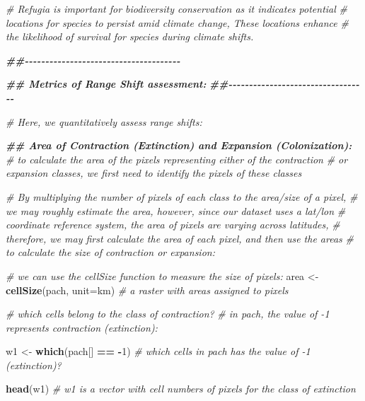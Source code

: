 \documentclass[
]{article}
\newenvironment{Shaded}{\begin{snugshade}}{\end{snugshade}}
\newcommand{\AttributeTok}[1]{\textcolor[rgb]{0.13,0.29,0.53}{#1}}
\newcommand{\CommentTok}[1]{\textcolor[rgb]{0.56,0.35,0.01}{\textit{#1}}}
\newcommand{\DecValTok}[1]{\textcolor[rgb]{0.00,0.00,0.81}{#1}}
\newcommand{\DocumentationTok}[1]{\textcolor[rgb]{0.56,0.35,0.01}{\textbf{\textit{#1}}}}
\newcommand{\FunctionTok}[1]{\textcolor[rgb]{0.13,0.29,0.53}{\textbf{#1}}}
\newcommand{\NormalTok}[1]{#1}
\newcommand{\OtherTok}[1]{\textcolor[rgb]{0.56,0.35,0.01}{#1}}
\newcommand{\SpecialCharTok}[1]{\textcolor[rgb]{0.81,0.36,0.00}{\textbf{#1}}}
\newcommand{\StringTok}[1]{\textcolor[rgb]{0.31,0.60,0.02}{#1}}
\begin{document}
\begin{Shaded}
\begin{Highlighting}[]
\CommentTok{\# Refugia is important for biodiversity conservation as it indicates potential }
\CommentTok{\# locations for species to persist amid climate change, These locations enhance }
\CommentTok{\# the likelihood of survival for species during climate shifts.}

\DocumentationTok{\#\#{-}{-}{-}{-}{-}{-}{-}{-}{-}{-}{-}{-}{-}{-}{-}{-}{-}{-}{-}{-}{-}{-}{-}{-}{-}{-}{-}{-}{-}{-}{-}{-}{-}{-}{-}{-}{-}{-}}

\DocumentationTok{\#\# Metrics of Range Shift assessment:}
\DocumentationTok{\#\#{-}{-}{-}{-}{-}{-}{-}{-}{-}{-}{-}{-}{-}{-}{-}{-}{-}{-}{-}{-}{-}{-}{-}{-}{-}{-}{-}{-}{-}{-}{-}{-}{-}{-}}

\CommentTok{\# Here, we quantitatively assess range shifts:}

\DocumentationTok{\#\# Area of Contraction (Extinction) and Expansion (Colonization):}
\CommentTok{\# to calculate the area of the pixels representing either of the contraction}
\CommentTok{\# or expansion classes, we first need to identify the pixels of these classes}

\CommentTok{\# By multiplying the number of pixels of each class to the area/size of a pixel,}
\CommentTok{\# we may roughly estimate the area, however, since our dataset uses a lat/lon}
\CommentTok{\# coordinate reference system, the area of pixels are varying across latitudes,}
\CommentTok{\# therefore, we may first calculate the area of each pixel, and then use the areas}
\CommentTok{\# to calculate the size of contraction or expansion:}

\CommentTok{\# we can use the cellSize function to measure the size of pixels:}
\NormalTok{area }\OtherTok{\textless{}{-}} \FunctionTok{cellSize}\NormalTok{(pach, }\AttributeTok{unit=}\StringTok{\textquotesingle{}km\textquotesingle{}}\NormalTok{) }\CommentTok{\# a raster with areas assigned to pixels}

\CommentTok{\# which cells belong to the class of contraction?}
\CommentTok{\# in pach, the value of {-}1 represents contraction (extinction):}

\NormalTok{w1 }\OtherTok{\textless{}{-}} \FunctionTok{which}\NormalTok{(pach[] }\SpecialCharTok{==} \SpecialCharTok{{-}}\DecValTok{1}\NormalTok{) }\CommentTok{\# which cells in pach has the value of {-}1 (extinction)?}

\FunctionTok{head}\NormalTok{(w1) }\CommentTok{\# w1 is a vector with cell numbers of pixels for the class of extinction}
\end{Highlighting}
\end{Shaded}
\end{document}
